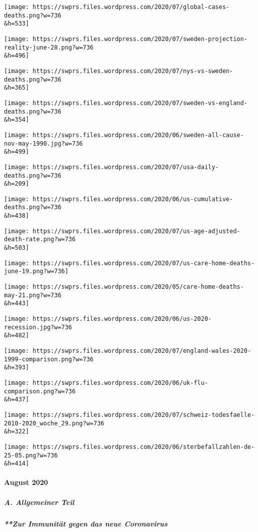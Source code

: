 \texttt{[image: https://swprs.files.wordpress.com/2020/07/global-cases-deaths.png?w=736\\\&h=533]}

\texttt{[image: https://swprs.files.wordpress.com/2020/07/sweden-projection-reality-june-28.png?w=736\\\&h=496]}

\texttt{[image: https://swprs.files.wordpress.com/2020/07/nys-vs-sweden-deaths.png?w=736\\\&h=365]}

\texttt{[image: https://swprs.files.wordpress.com/2020/07/sweden-vs-england-deaths.png?w=736\\\&h=354]}

\texttt{[image: https://swprs.files.wordpress.com/2020/06/sweden-all-cause-nov-may-1990.jpg?w=736\\\&h=499]}

\texttt{[image: https://swprs.files.wordpress.com/2020/07/usa-daily-deaths.png?w=736\\\&h=209]}

\texttt{[image: https://swprs.files.wordpress.com/2020/06/us-cumulative-deaths.png?w=736\\\&h=438]}

\texttt{[image: https://swprs.files.wordpress.com/2020/07/us-age-adjusted-death-rate.png?w=736\\\&h=503]}

\texttt{[image: https://swprs.files.wordpress.com/2020/07/us-care-home-deaths-june-19.png?w=736]}

\texttt{[image: https://swprs.files.wordpress.com/2020/05/care-home-deaths-may-21.png?w=736\\\&h=443]}

\texttt{[image: https://swprs.files.wordpress.com/2020/06/us-2020-recession.jpg?w=736\\\&h=482]}

\texttt{[image: https://swprs.files.wordpress.com/2020/07/england-wales-2020-1999-comparison.png?w=736\\\&h=393]}

\texttt{[image: https://swprs.files.wordpress.com/2020/06/uk-flu-comparison.png?w=736\\\&h=437]}

\texttt{[image: https://swprs.files.wordpress.com/2020/07/schweiz-todesfaelle-2010-2020\_woche\_29.png?w=736\\\&h=322]}

\texttt{[image: https://swprs.files.wordpress.com/2020/06/sterbefallzahlen-de-25-05.png?w=736\\\&h=414]}

\hypertarget{august-2020}{%
\paragraph{August 2020}\label{august-2020}}

\hypertarget{a-allgemeiner-teil}{%
\subparagraph{A. Allgemeiner Teil}\label{a-allgemeiner-teil}}

\hypertarget{zur-immunituxe4t-gegen-das-neue-coronavirus}{%
\subparagraph{**Zur Immunität gegen das neue
Coronavirus}\label{zur-immunituxe4t-gegen-das-neue-coronavirus}}

